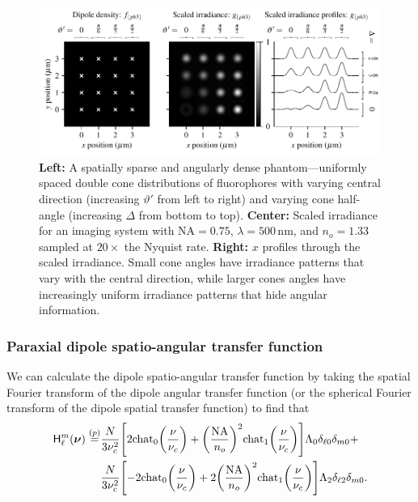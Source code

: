 \documentclass[]{osa-article}
\let\originalleft\left
\let\originalright\right
\renewcommand{\left}{\mathopen{}\mathclose\bgroup\originalleft}
\renewcommand{\right}{\aftergroup\egroup\originalright}
\providecommand{\msf}[1]{\mathsf{#1}}
\providecommand{\bs}[1]{\boldsymbol{#1}}
\providecommand{\bv}{\bs{\nu}}
\begin{document}
  \begin{figure}[ht]
 \centering
   \centering
   \includegraphics[scale=0.8]{../figures/paratfs/ph3.pdf}
   \caption{\textbf{Left:} A spatially sparse and angularly dense
     phantom---uniformly spaced double cone distributions of fluorophores with
     varying central direction (increasing $\vartheta'$ from left to right) and
     varying cone half-angle (increasing $\Delta$ from bottom to top).
     \textbf{Center:} Scaled irradiance for an imaging system with
     $\text{NA} = 0.75$, $\lambda = 500\,\text{nm}$, and $n_o = 1.33$ sampled at
     $20\times$ the Nyquist rate. \textbf{Right:} $x$ profiles through the
     scaled irradiance. Small cone angles have irradiance patterns that vary
     with the central direction, while larger cones angles have increasingly
     uniform irradiance patterns that hide angular information.}
   \label{fig:ph3}
 \end{figure}

 \subsubsection{Paraxial dipole spatio-angular transfer function}
 We can calculate the dipole spatio-angular transfer function by taking the
 spatial Fourier transform of the dipole angular transfer function (or the
 spherical Fourier transform of the dipole spatial transfer function) to find
 that
 \begin{align}
\msf{H}_{\ell}^m(\bv) \stackrel{(p)}{=} &\frac{N}{3\nu_c^2}\left[2\text{chat}_0\left(\frac{\nu}{\nu_c}\right) + \left(\frac{\text{NA}}{n_o}\right)^2\text{chat}_1\left(\frac{\nu}{\nu_c}\right)\right]\Lambda_0\delta_{\ell0}\delta_{m0}+\nonumber\\ &\frac{N}{3\nu_c^2}\left[-2\text{chat}_0\left(\frac{\nu}{\nu_c}\right) + 2\left(\frac{\text{NA}}{n_o}\right)^2\text{chat}_1\left(\frac{\nu}{\nu_c}\right)\right]\Lambda_2\delta_{\ell2}\delta_{m0}.
 \end{align}
\end{document}
